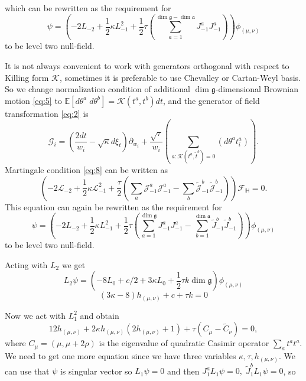 \documentclass[a4paper]{article}
\theoremstyle{definition}
\newcommand{\gf}{\mathfrak{g}}
\newcommand{\af}{\mathfrak{a}}
\theoremstyle{definition} \newtheorem{Def}{Definition}
\begin{document}
which can be rewritten as the requirement for
\begin{equation} \psi=\left(-2L_{-2}+\frac{1}{2}\kappa L_{-1}^{2}+\frac{1}{2}\tau
\left(\sum_{a=1}^{\dim\gf-\dim\af}J^{a}_{-1}J^{a}_{-1}\right)\right)
\phi_{(\mu,\nu)}
\label{eq:10}
\end{equation}
 to be level two null-field.

 It is not always convenient to work with generators
orthogonal with respect to Killing form $\mathcal{K}$, sometimes it is preferable to use Chevalley
or Cartan-Weyl basis. So we change normalization condition of additional
$\dim\gf$-dimensional Brownian motion \eqref{eq:5} to $\mathbb{E}\left[d\theta^{a}\;
d\theta^{b}\right]=\mathcal{K}(t^{a},t^{b})dt$, and the generator of field transformation
\eqref{eq:2} is
\begin{equation*} \mathcal{G}_{i}=\left(\frac{2dt}{w_{i}}-\sqrt{\kappa}
d\xi_{t}\right) \partial_{w_{i}}+\frac{\sqrt{\tau}}{w_{i}}\left(\sum_{a:\mathcal{K}(t^{a},\tilde{t}^{b})=0}\left(d
\theta ^{a} t^{a}_{i}\right)\right).
\end{equation*}
 Martingale condition \eqref{eq:8} can be written as
\begin{equation*} \left(-2 \mathcal{L}_{-2}+\frac{1}{2}\kappa
\mathcal{L}_{-1}^{2}+\frac{\tau}{2}\left( \sum_{a} \mathcal{J}^{a}_{-1} \mathcal{J}^{a}_{-1}-
\sum_{b}\tilde{\mathcal{J}}^{b}_{-1} \tilde{\mathcal{J}}^{b}_{-1}\right)\right)
\mathcal{F}_{\mathbb{H}}=0.
\end{equation*}
 This equation can again be rewritten as the requirement for
\begin{equation} \psi=\left(-2L_{-2}+\frac{1}{2}\kappa L_{-1}^{2}+\frac{1}{2}\tau
\left(\sum_{a=1}^{\dim\gf}J^{a}_{-1}J^{a}_{-1}-\sum_{b=1}^{\dim\af}\tilde{J}^{b}_{-1}\tilde{J}^{b}_{-1}\right)\right)
\phi_{(\mu,\nu)}
\label{eq:30}
\end{equation}
 to be level two null-field.

Acting with $L_{2}$ we get
\begin{equation*}
  L_{2}\psi= \left(-8 L_{0}+c/2+ 3 \kappa L_{0}+\frac{1}{2}\tau k \dim\gf\right)
\phi_{(\mu,\nu)}
\end{equation*}
\begin{equation}
  \label{eq:28} (3\kappa-8) h_{(\mu,\nu)}+c+\tau k =0
\end{equation}

Now we act with $L_{1}^{2}$  and obtain
\begin{equation}
  \label{eq:17} 12 h_{(\mu,\nu)}+2\kappa h_{(\mu,\nu)} (2h_{(\mu,\nu)}+1) + \tau
(C_{\mu}-\tilde{C}_{\nu})=0,
\end{equation}
 where $C_{\mu}=(\mu,\mu+2\rho)$ is the eigenvalue of quadratic Casimir operator
$\sum_{a}t^{a}t^{a}$. We need to get one more equation since we
have three variables $\kappa,\tau,h_{(\mu,\nu)}$. We can use that $\psi$ is singular vector so
$L_{1}\psi=0$ and then $J_{1}^{a}L_{1}\psi=0,\; \tilde{J}_{1}^{b} L_{1}\psi=0$, so
\end{document}
